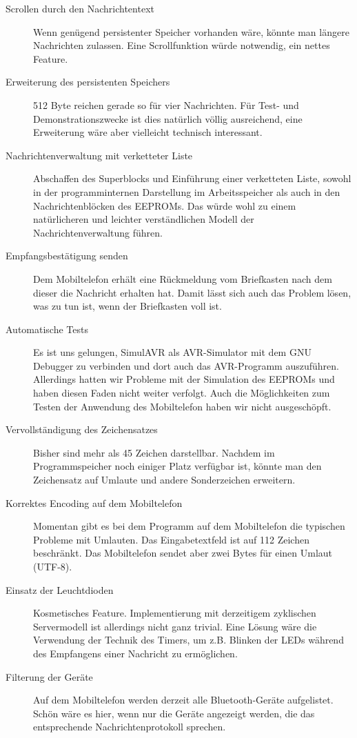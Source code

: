 \documentclass[ngerman]{article}
\begin{document}
\begin{description}
    \item[Scrollen durch den Nachrichtentext] Wenn genügend persistenter Speicher vorhanden wäre, könnte man 
        längere Nachrichten zulassen. Eine Scrollfunktion würde notwendig, ein nettes
        Feature.
    \item[Erweiterung des persistenten Speichers] 512 Byte reichen gerade so für vier Nachrichten. Für Test-
        und Demonstrationszwecke ist dies natürlich völlig ausreichend, eine Erweiterung wäre aber vielleicht
        technisch interessant.
    \item[Nachrichtenverwaltung mit verketteter Liste] Abschaffen des Superblocks und Einführung einer verketteten
        Liste, sowohl in der programminternen Darstellung im Arbeitsspeicher als auch in den Nachrichtenblöcken
        des EEPROMs. Das würde wohl zu einem natürlicheren und leichter ver\-ständ\-lichen Modell der 
        Nachrichtenverwaltung führen.
    \item[Empfangsbestätigung senden] Dem Mobiltelefon erhält eine Rückmeldung vom Briefkasten nach dem
        dieser die Nachricht erhalten hat. Damit lässt sich auch das Problem lösen, was zu tun ist, 
        wenn der Briefkasten voll ist.
    \item[Automatische Tests] Es ist uns gelungen, SimulAVR als AVR-Simulator mit dem GNU Debugger
        zu verbinden und dort auch das AVR-Programm auszuführen. Allerdings hatten wir Probleme mit
        der Simulation des EEPROMs und haben diesen Faden nicht weiter verfolgt. Auch die Möglichkeiten
        zum Testen der Anwendung des Mobiltelefon haben wir nicht ausgeschöpft.
    \item[Vervollständigung des Zeichensatzes] Bisher sind mehr als 45 Zeichen darstellbar. Nachdem im
        Programmspeicher noch einiger Platz verfügbar ist, könnte man den Zeichensatz auf Umlaute
        und andere Sonderzeichen erweitern.
    \item[Korrektes Encoding auf dem Mobiltelefon] Momentan gibt es bei dem Programm auf dem Mobiltelefon
        die typischen Probleme mit Umlauten. Das Eingabetextfeld ist auf 112 Zeichen beschränkt. Das
        Mobiltelefon sendet aber zwei Bytes für einen Umlaut (UTF-8).
    \item[Einsatz der Leuchtdioden] Kosmetisches Feature. Implementierung mit derzeitigem zyklischen Servermodell
        ist allerdings nicht ganz trivial. Eine Lösung wäre die Verwendung der Technik des Timers, um z.B.
        Blinken der LEDs während des Empfangens einer Nachricht zu ermöglichen.
    \item[Filterung der Geräte] Auf dem Mobiltelefon werden derzeit alle Bluetooth-Geräte aufgelistet. Schön
        wäre es hier, wenn nur die Geräte angezeigt werden, die das entsprechende Nachrichtenprotokoll
	sprechen.
\end{description}
\end{document}
